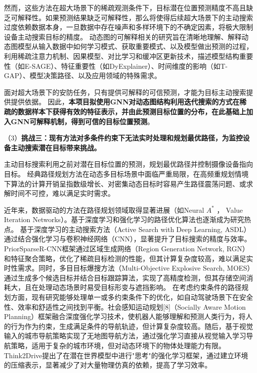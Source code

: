 然而，这些方法在超大场景下的稀疏观测条件下，目标潜在位置预测精度不高且缺乏可解释性。如果预测结果缺乏可解释性，那么将使得后续超大场景下的主动搜索过度依赖数据本身，一旦数据中存在噪声和多样环境下的不确定因素，将极大限制设备主动搜索目标的精度。
动态图的可解释相关的研究旨在清晰地理解、解释动态图模型从输入数据中如何学习模式、获取重要模式、以及模型做出预测的过程，利用稀疏注意力机制、因果模型\cite{zhao2024causality}、对比学习\cite{wang2024dyexplainer}和缓冲区更新技术，描述模型结构重要性（如E-SAGE\cite{wang2024esage}）、特征重要性（如DyExplainer\cite{wang2024dyexplainer}）、时间维度的影响（如T-GAP\cite{jung2021learning}）、模型决策路径\cite{}、以及应用领域的特殊需求。

面对超大场景下的安防任务，只有提供可解释的可信预测，才能为目标主动搜索提供提供依据。
因此，\textbf{本项目拟使用GNN对动态图结构利用迭代搜索的方式在稀疏的数据样本下获得有效的特征表示，并由此预测目标位置的分布，在此基础上加入GNN可解释机制，得到可信的目标位置预测}。


（3）\textbf{挑战三：现有方法对多条件约束下无法实时处理和规划最优路径，为监控设备主动搜索潜在目标带来挑战。}

主动目标搜索利用之前对潜在目标位置的预测，规划最优路径并控制摄像设备指向目标。
经典路径规划方法在动态多目标场景中面临严重局限，在高频重规划情境下算法的计算开销呈指数级增长\cite{bhardwaj2017learningheuristicsearchimitation}、对密集动态目标时容易产生路径震荡问题\cite{9154607}、或求解时间不可控\cite{10.1145/3272127.3275109}，难以满足实时需求。

近年来，数据驱动的方法在路径规划领域取得显著进展（如Neural $A^{\ast}$ \cite{Archetti_2022}， Value Iteration Networks\cite{tamar2017valueiterationnetworks}）。基于深度学习和强化学习的路径优化算法也逐渐成为研究热点\cite{zheng2023distributed,cui2024multi,fang2024improved}。
基于深度学习的主动搜索方法\cite{DBLP:conf/iclr/HottungKT22}（Active Search with Deep Learning, ASDL）通过结合强化学习与卷积神经网络（CNN），显著提升了目标搜索的精度与效率。
PriorSparseR-CNN框架\cite{wang2024priorsparse}通过区域生成网络（Region Generation Network, RGN）和特征聚合策略，优化了稀疏目标检测的性能，但其计算复杂度较高，难以满足实时性需求。同时，多目目标爆搜方法（Multi-Objective Explosive Search, MOES）\cite{moes2024}通过生成多个候选目标并结合目标跟踪算法，实现了高精度检测，但其存储空间消耗大，且在处理动态场景时易受目标形变与遮挡影响。
在考虑约束条件的路径规划方面，现有研究能够处理单一或多约束条件下的优化，如自动驾驶场景下在安全性、效率和舒适性之间找到平衡\cite{yang2019generalizedalgorithmmultiobjectivereinforcement}。社会感知运动规划[8]（Socially Aware Motion Planning）框架融合深度强化学习技术，使机器人能够理解和预测人类行为，将人的行为作为约束，生成满足条件的导航轨迹，但计算复杂度较高。随后，基于视觉输入的城市导航策略\cite{mirowski2019learningnavigatecitiesmap}实现了无地图导航方法，通过强化学习直接从视觉输入学习导航策略，适用于复杂的城市环境，但对动态环境下的物体处理能力有限。
Think2Drive\cite{li2024think2driveefficientreinforcementlearning}提出了在潜在世界模型中进行"思考"的强化学习框架，通过建立环境的压缩表示，显著减少了对大量物理仿真的依赖，提高了学习效率。

